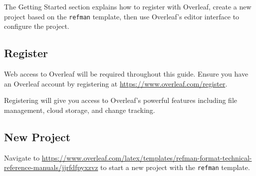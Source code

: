 
The Getting Started section explains how to register with Overleaf, create a new project based on the \texttt{refman} template, then use Overleaf's editor interface to configure the project.

\subsection{Register}
Web access to Overleaf will be required throughout this guide. Ensure you have an Overleaf account by registering at \url{https://www.overleaf.com/register}. 

\begin{minipage}{\linewidth}
\end{minipage}

Registering will give you access to Overleaf's powerful features including file management, cloud storage, and change tracking.

\subsection{New Project}
Navigate to
\url{https://www.overleaf.com/latex/templates/refman-format-technical-reference-manuals/jjrfdfpyxzvz} to start a new project with the \texttt{refman} template.

\begin{minipage}{\linewidth}
\centering
{}
\end{minipage}


